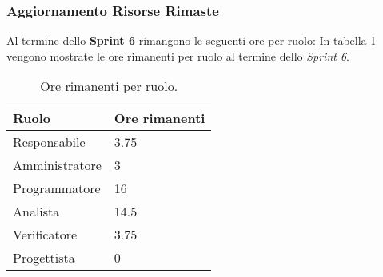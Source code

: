 \subsubsection{Aggiornamento Risorse Rimaste}
\label{sec:AggiornamentoRisorse_Sprint6}
Al termine dello \textbf{Sprint 6} rimangono le seguenti ore per ruolo: \hyperref[tab:sprint6_ore_rimanenti]{In tabella \ref{tab:sprint6_ore_rimanenti}} vengono mostrate le ore rimanenti per ruolo al termine dello \textit{Sprint 6}.

\begin{table}[H]
    \centering
    \begin{tabular}{| l | l |}
    \hline
    \textbf{Ruolo} & 
    \textbf{Ore rimanenti}\\
    \hline
        Responsabile & 3.75\\
    \hline
        Amministratore & 3\\
    \hline
        Programmatore & 16\\
    \hline
        Analista & 14.5\\
    \hline
        Verificatore & 3.75\\
    \hline
        Progettista & 0\\
    \hline
    \end{tabular}
    \caption{Ore rimanenti per ruolo.}
    \label{tab:sprint6_ore_rimanenti} 
\end{table}